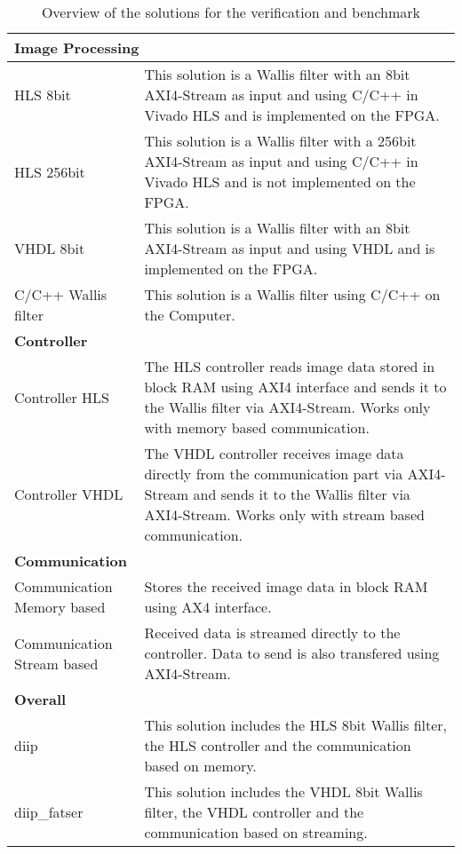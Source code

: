 \begin{table}[tb!]
    \centering
    \begin{tabular}{p{3.8cm} p{10cm}}
        \toprule
        \multicolumn{2}{l}{\textbf{Image Processing}}\\
        \toprule
        HLS 8bit & This solution is a Wallis filter with an 8bit AXI4-Stream as input and using C/C++ in Vivado HLS and is implemented on the FPGA.\\
        \midrule
        HLS 256bit & This solution is a Wallis filter with a 256bit AXI4-Stream as input and using C/C++ in Vivado HLS and is not implemented on the FPGA.\\
        \midrule
        VHDL 8bit & This solution is a Wallis filter with an 8bit AXI4-Stream as input and using VHDL and is implemented on the FPGA.\\
        \midrule
        C/C++ Wallis filter & This solution is a Wallis filter using C/C++ on the Computer.\\
        \toprule
        \multicolumn{2}{l}{\textbf{Controller}}\\
        \toprule
        Controller HLS &  The HLS controller reads image data stored in block RAM using AXI4 interface and sends it to the Wallis filter via AXI4-Stream. Works only with memory based communication. \\
        \midrule
        Controller VHDL & The VHDL controller receives image data directly from the communication part via AXI4-Stream and sends it to the Wallis filter via AXI4-Stream. Works only with stream based communication. \\
        \toprule
        \multicolumn{2}{l}{\textbf{Communication}}\\
        \toprule
        Communication Memory based & Stores the received image data in block RAM using AX4 interface. \\
        \midrule
        Communication Stream based & Received data is streamed directly to the controller. Data to send is also transfered using AXI4-Stream. \\
        \toprule
        \multicolumn{2}{l}{\textbf{Overall}}\\
        \toprule
        diip & This solution includes the HLS 8bit Wallis filter, the HLS controller and the communication based on memory. \\
        \midrule
        diip\_fatser & This solution includes the VHDL 8bit Wallis filter, the VHDL controller and the communication based on streaming. \\
        \bottomrule
    \end{tabular}
    \caption{Overview of the solutions for the verification and benchmark}
    \label{tab:ver:overview}
\end{table}

